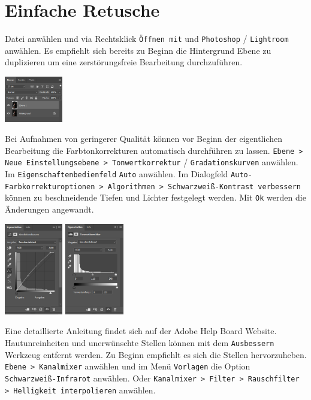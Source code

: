 \documentclass{school}
\begin{document}
\newpage
\section{Einfache Retusche}
\begin{outline}[enumerate]
\1 Datei anwählen und via Rechtsklick \texttt{Öffnen mit} und \texttt{Photoshop} / \texttt{Lightroom} anwählen.
\1 Es empfiehlt sich bereits zu Beginn die Hintergrund Ebene zu duplizieren um eine zerstörungsfreie Bearbeitung durchzuführen.

\includegraphics[height=2cm]{retusche-01-ebene.png}

\1 Bei Aufnahmen von geringerer Qualität können vor Beginn der eigentlichen Bearbeitung die Farbtonkorrekturen automatisch durchführen zu lassen.
	\2 \texttt{Ebene > Neue Einstellungsebene > Tonwertkorrektur} / \texttt{Gradationskurven} anwählen.
	\2 Im \texttt{Eigenschaftenbedienfeld} \texttt{Auto} anwählen.
	\2 Im Dialogfeld \texttt{Auto-Farbkorrekturoptionen > Algorithmen > Schwarzweiß-Kontrast verbessern} können zu beschneidende Tiefen und Lichter festgelegt werden.
	\2 Mit \texttt{Ok} werden die Änderungen angewandt.

\includegraphics[height=4cm]{retusche-02-grad.png}
\includegraphics[height=4cm]{retusche-03-tonwert.png}

	Eine detaillierte Anleitung findet sich auf der Adobe Help Board Website\cite{adobe-quick-adjustments}.
\1 Hautunreinheiten und unerwünschte Stellen können mit dem \texttt{Ausbessern} Werkzeug entfernt werden.
	\2 Zu Beginn empfiehlt es sich die Stellen hervorzuheben.
		\3 \texttt{Ebene > Kanalmixer} anwählen und im Menü \texttt{Vorlagen} die Option\\\texttt{Schwarzweiß-Infrarot} anwählen.
			\4 Oder \texttt{Kanalmixer > Filter > Rauschfilter > Helligkeit interpolieren} anwählen.


\end{outline}
\end{document}
